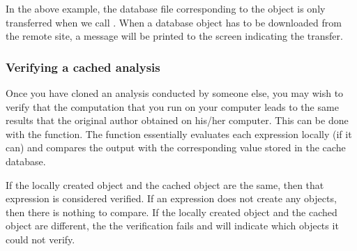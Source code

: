 \documentclass[nojss]{jss}
\begin{document}
In the above example, the database file corresponding to the object
 is only transferred when we call .  When a
database object has to be downloaded from the remote site, a message
will be printed to the screen indicating the transfer.




\subsubsection{Verifying a cached analysis}
\label{sec:exampleverify}

Once you have cloned an analysis conducted by someone else, you may
wish to verify that the computation that you run on your computer
leads to the same results that the original author obtained on his/her
computer.  This can be done with the  function.  The
 function essentially evaluates each expression
locally (if it can) and compares the output with the corresponding
value stored in the cache database.

If the locally created object and the cached object are the same, then
that expression is considered verified.  If an expression does not
create any objects, then there is nothing to compare.  If the locally
created object and the cached object are different, the the
verification fails and  will indicate which objects it
could not verify.
\end{document}
